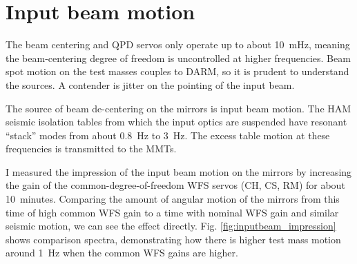 \section{Input beam motion}

The beam centering and QPD servos only operate up to about 10~mHz,
meaning the beam-centering degree of freedom is uncontrolled at higher
frequencies. Beam spot motion on the test masses couples to
DARM, so it is prudent to understand the sources. A contender is
jitter on the pointing of the input beam. 

The source of beam de-centering on the mirrors is input
beam motion. The HAM seismic isolation tables from which the input
optics are suspended have resonant ``stack'' modes from about 0.8~Hz
to 3~Hz. The excess table motion at these frequencies is transmitted
to the MMTs.

I measured the impression of the input beam motion on the mirrors by
increasing the gain of the common-degree-of-freedom WFS servos (CH,
CS, RM) for about 10~minutes. Comparing the amount of angular
motion of the mirrors from this time of high common WFS gain to a time
with nominal WFS gain and similar seismic motion, we can see the
effect directly. Fig. \ref{fig:inputbeam_impression} shows comparison
spectra, demonstrating how there is higher test mass motion around
1~Hz when the common WFS gains are higher.

